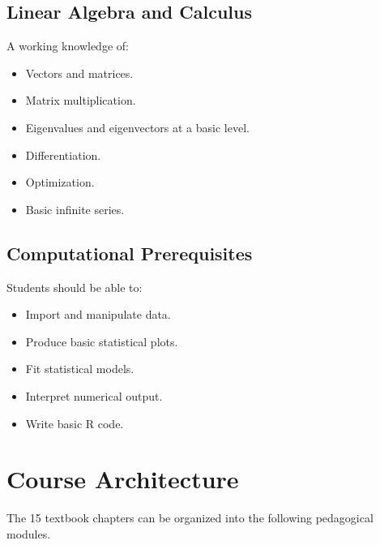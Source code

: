 \documentclass[11pt,a4paper]{article}
\begin{document}
\subsection{Linear Algebra and Calculus}

A working knowledge of:

\begin{itemize}
    \item Vectors and matrices.
    \item Matrix multiplication.
    \item Eigenvalues and eigenvectors at a basic level.
    \item Differentiation.
    \item Optimization.
    \item Basic infinite series.
\end{itemize}

\subsection{Computational Prerequisites}

Students should be able to:

\begin{itemize}
    \item Import and manipulate data.
    \item Produce basic statistical plots.
    \item Fit statistical models.
    \item Interpret numerical output.
    \item Write basic R code.
\end{itemize}

\section{Course Architecture}

The 15 textbook chapters can be organized into the following pedagogical
modules.
\end{document}
